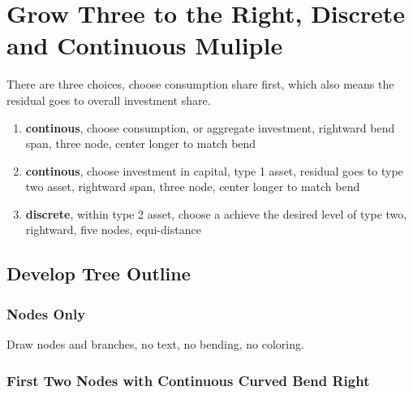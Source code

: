 \documentclass{article}
\begin{document}
\section{Grow Three to the Right, Discrete and Continuous Muliple}

There are three choices, choose consumption share first, which also means the residual goes to overall investment share.

\begin{enumerate}
  \item \textbf{continous}, choose consumption, or aggregate investment, rightward bend span, three node, center longer to match bend
  \item \textbf{continous}, choose investment in capital, type 1 asset, residual goes to type two asset, rightward span, three node, center longer to match bend
  \item \textbf{discrete}, within type 2 asset, choose a achieve the desired level of type two, rightward, five nodes, equi-distance
\end{enumerate}

\subsection{Develop Tree Outline}

\subsubsection{Nodes Only}

Draw nodes and branches, no text, no bending, no coloring.

\def\famm{5mm}
\begin{center}
\end{center}


\subsubsection{First Two Nodes with Continuous Curved Bend Right}
\end{document}
